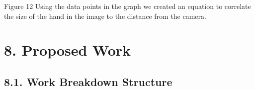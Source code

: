 \documentclass[10pt]{article}
\begin{document}
Figure 12 Using the data points in the graph we created an equation to correlate the size of the hand in the image to the distance from the camera.



\section{8. Proposed Work}

\subsection{8.1. Work Breakdown Structure}






















\end{document}
